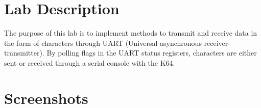 \documentclass[CMPE]{KGCOEReport}
\begin{document}
\maketitle

%

\section*{Lab Description}
The purpose of this lab is to implement methods to transmit and receive data in the form of characters through UART (Universal asynchronous receiver-transmitter). By polling flags in the UART status registers, characters are either sent or received through a serial console with the K64. 

\section*{Screenshots}
\end{document}
